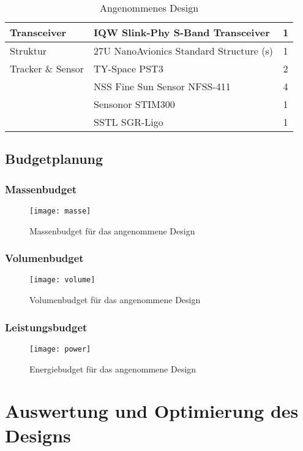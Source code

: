 \begin{table}[]
\begin{tabular}{|l|l|c|}
Transceiver                     & IQW Slink-Phy S-Band Transceiver              & 1      \\ \hline
Struktur                        & 27U NanoAvionics Standard Structure (s)       & 1      \\ \hline
Tracker \& Sensor               & TY-Space PST3                                 & 2      \\ \hline
                                & NSS Fine Sun Sensor NFSS-411                  & 4      \\ \hline
                                & Sensonor STIM300                              & 1      \\ \hline
                                & SSTL SGR-Ligo                                 & 1      \\ \hline
\end{tabular}
\caption{Angenommenes Design}
\label{tab:cubesatdesign}
\end{table}
				\subsection{Budgetplanung}
				
						\subsubsection{Massenbudget}
								
										\begin{figure}[h]
											\centering
												\texttt{[image: masse]}
											\caption{Massenbudget für das angenommene Design}
											\label{fig:masse}
										\end{figure}
										
						\subsubsection{Volumenbudget}
								
										\begin{figure}[h]
											\centering
												\texttt{[image: volume]}
											\caption{Volumenbudget für das angenommene Design}
											\label{fig:volume}
										\end{figure}
								
						\subsubsection{Leistungsbudget}
				
										\begin{figure}[h]
											\centering
												\texttt{[image: power]}
											\caption{Energiebudget für das angenommene Design}
											\label{fig:power}
										\end{figure}
										
			\section{Auswertung und Optimierung des Designs}

				

